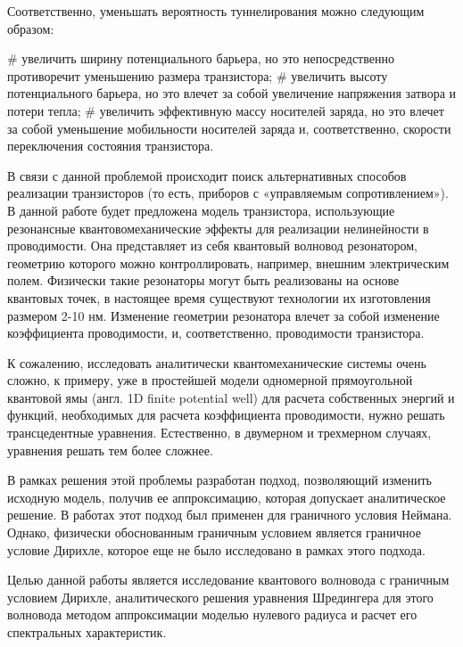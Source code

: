 Соответственно, уменьшать вероятность туннелирования можно следующим образом:

\begin{easylist}[itemize]
# увеличить ширину потенциального барьера, но это непосредственно противоречит уменьшению размера транзистора;
# увеличить высоту потенциального барьера, но это влечет за собой увеличение напряжения затвора и потери тепла;
# увеличить эффективную массу носителей заряда, но это влечет за собой уменьшение мобильности носителей заряда и, соответственно, скорости переключения состояния транзистора.
\end{easylist}

В связи с данной проблемой происходит поиск альтернативных способов реализации транзисторов (то есть, приборов с «управляемым сопротивлением»). В данной работе будет предложена модель транзистора, использующие резонансные квантовомеханические эффекты для реализации нелинейности в проводимости. Она представляет из себя квантовый волновод резонатором, геометрию которого можно контроллировать, например, внешним электрическим полем. Физически такие резонаторы могут быть реализованы на основе квантовых точек, в настоящее время существуют технологии их изготовления размером 2-10 нм. Изменение геометрии резонатора влечет за собой изменение коэффициента проводимости, и, соответственно, проводимости транзистора.

К сожалению, исследовать аналитически квантомеханические системы очень сложно, к примеру, уже в простейшей модели одномерной прямоугольной квантовой ямы (англ. 1D finite potential well) для расчета собственных энергий и функций, необходимых для расчета коэффициента проводимости, нужно решать трансцедентные уравнения. Естественно, в двумерном и трехмерном случаях, уравнения решать тем более сложнее.

В рамках решения этой проблемы разработан подход, позволяющий изменить исходную модель, получив ее аппроксимацию, которая допускает аналитическое решение. В работах \cite{popov1992extension, popov1992resonator, popov1993zero} этот подход был применен для граничного условия Неймана. Однако, физически обоснованным граничным условием является граничное условие Дирихле, которое еще не было исследовано в рамках этого подхода.

Целью данной работы является исследование квантового волновода с граничным условием Дирихле, аналитического решения уравнения Шредингера для этого волновода методом аппроксимации моделью нулевого радиуса и расчет его спектральных характеристик.